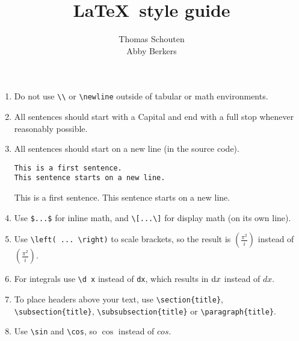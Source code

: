 \documentclass[11pt]{exam}
\title{\LaTeX\ style guide}
\author{Thomas Schouten \\ Abby Berkers}
\begin{document}
    \maketitle
    \begin{enumerate}
        \item Do not use \verb|\\| or \verb|\newline| outside of tabular or math environments.

        \item All sentences should start with a Capital and end with a full stop whenever reasonably possible.

        \item All sentences should start on a new line (in the source code).
        \begin{lstlisting}
This is a first sentence.
This sentence starts on a new line.
        \end{lstlisting}
        This is a first sentence.
        This sentence starts on a new line.

        \item Use \verb|$...$| for inline math, and \verb|\[...\]| for display math (on its own line).

        \item Use \verb|\left( ... \right)| to scale brackets, so the result is $\left( \frac{\pi^2}{i} \right)$ instead of $(\frac{\pi^2}{i})$.

        \item For integrals use \verb|\d x| instead of \verb|dx|, which results in $\mathop{}\!\mathrm{d} x$ instead of $dx$.

        \item To place headers above your text, use \verb|\section{title}|, \verb|\subsection{title}|, \verb|\subsubsection{title}| or \verb|\paragraph{title}|.

        \item Use \verb|\sin| and \verb|\cos|, so $\cos$ instead of $cos$.


\end{enumerate}
\end{document}
